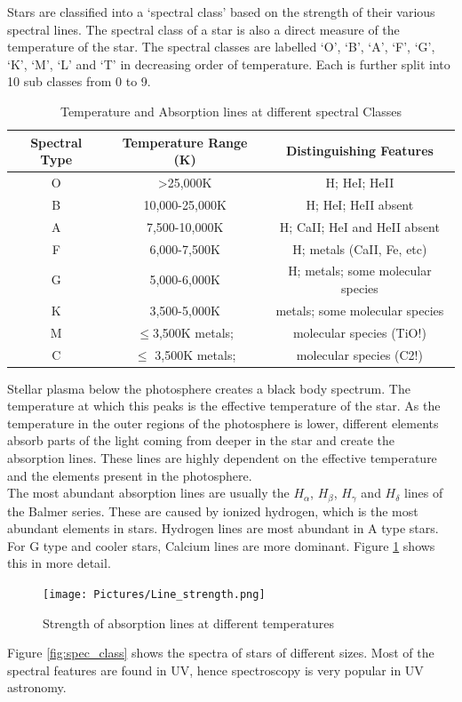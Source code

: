 \documentclass[12pt,a4paper]{article}
\begin{document}
    Stars are classified into a `spectral class' based on the strength of their various spectral lines. The spectral class of a star is also a direct measure of the temperature of the star. The spectral classes are labelled
    `O', `B', `A', `F', `G', `K', `M', `L' and `T' in decreasing order of temperature. Each is further split into 10 sub classes from 0 to 9. \\
    \begin{table}[H]
      \begin{tabular}{||c|c|c||}
        \hline
        Spectral Type & Temperature Range (K) & Distinguishing Features\\
        \hline
        \hline
        O	& \textgreater 25,000K	&H; HeI; HeII\\
        B	&10,000-25,000K	&H; HeI; HeII absent\\
        A	&7,500-10,000K	&H; CaII; HeI and HeII absent\\
        F	&6,000-7,500K	  &H; metals (CaII, Fe, etc)\\
        G	&5,000-6,000K  	&H; metals; some molecular species\\
        K	&3,500-5,000K	  &metals; some molecular species\\
        M	&$\leq $3,500K	metals;& molecular species (TiO!)\\
        C	&$\leq $ 3,500K	metals; &molecular species (C2!)\\
        \hline
      \end{tabular}
      \caption{Temperature and Absorption lines at different spectral Classes\cite{Spectral_Classification}}
    \end{table} 
    Stellar plasma below the photosphere creates a black body spectrum. The temperature at which this peaks is the effective temperature of the star. As the temperature in the outer regions of the photosphere is lower,
    different elements absorb parts of the light coming from deeper in the star and create the absorption lines. These lines are highly dependent on the effective temperature and the elements present in the photosphere.
    \\
    The most abundant absorption lines are usually the $H_\alpha$, $H_\beta$, $H_\gamma$ and $H_\delta$ lines of the Balmer series. These are caused by ionized hydrogen, which is the most abundant elements in stars.
    Hydrogen lines are most abundant in A type stars. For G type and cooler stars, Calcium lines are more dominant. Figure \ref{fig:abs_lines} shows this in more detail.
    \begin{figure}[H]
      \centering
      \texttt{[image: Pictures/Line\_strength.png]}
      \caption{Strength of absorption lines at different temperatures}
      \label{fig:abs_lines}
    \end{figure}
    Figure \ref{fig:spec_class} shows the spectra of stars of different sizes. Most of the spectral features are found in UV, hence spectroscopy is very popular in UV astronomy. 
    
\end{document}
